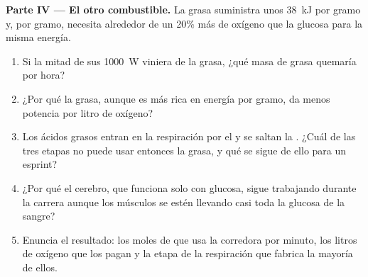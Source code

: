 \begin{problem}
\medskip
\noindent\textbf{Parte IV --- El otro combustible.}
La grasa suministra unos \qty{38}{kJ} por gramo y, por gramo, necesita
alrededor de un 20\% más de oxígeno que la glucosa para la misma
energía.
\begin{enumerate}[resume]
  \item Si la mitad de sus \qty{1000}{W} viniera de la grasa, ¿qué masa
        de grasa quemaría por hora?
  \item ¿Por qué la grasa, aunque es más rica en energía por gramo, da
        menos potencia por litro de oxígeno?
  \item Los ácidos grasos entran en la respiración por el  y se saltan la . ¿Cuál de las tres etapas no
        puede usar entonces la grasa, y qué se sigue de ello para un
        esprint?
  \item ¿Por qué el cerebro, que funciona solo con glucosa, sigue
        trabajando durante la carrera aunque los músculos se estén
        llevando casi toda la glucosa de la sangre?
  \item Enuncia el resultado: los moles de  que usa la corredora por
        minuto, los litros de oxígeno que los pagan y la etapa de la
        respiración que fabrica la mayoría de ellos.
\end{enumerate}
\end{problem}
